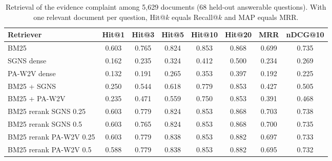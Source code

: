 \begin{table}[H]
\centering
\footnotesize
\caption{Retrieval of the evidence complaint among 5,629 documents (68 held-out answerable questions). With one relevant document per question, Hit@$k$ equals Recall@$k$ and MAP equals MRR.}
\label{tab:retrieval}
\begin{tabular}{lccccccc}
\toprule
Retriever & Hit@1 & Hit@3 & Hit@5 & Hit@10 & Hit@20 & MRR & nDCG@10 \\
\midrule
BM25 & 0.603 & 0.765 & 0.824 & 0.853 & 0.868 & 0.699 & 0.735 \\
SGNS dense & 0.162 & 0.235 & 0.324 & 0.412 & 0.500 & 0.234 & 0.269 \\
PA-W2V dense & 0.132 & 0.191 & 0.265 & 0.353 & 0.397 & 0.192 & 0.225 \\
BM25 + SGNS & 0.250 & 0.544 & 0.618 & 0.779 & 0.853 & 0.427 & 0.505 \\
BM25 + PA-W2V & 0.235 & 0.471 & 0.559 & 0.750 & 0.853 & 0.391 & 0.468 \\
BM25 rerank SGNS 0.25 & 0.603 & 0.779 & 0.824 & 0.853 & 0.868 & 0.703 & 0.738 \\
BM25 rerank SGNS 0.5 & 0.603 & 0.765 & 0.824 & 0.853 & 0.868 & 0.700 & 0.735 \\
BM25 rerank PA-W2V 0.25 & 0.603 & 0.779 & 0.838 & 0.853 & 0.882 & 0.697 & 0.733 \\
BM25 rerank PA-W2V 0.5 & 0.588 & 0.779 & 0.838 & 0.853 & 0.882 & 0.695 & 0.732 \\
\bottomrule
\end{tabular}
\end{table}